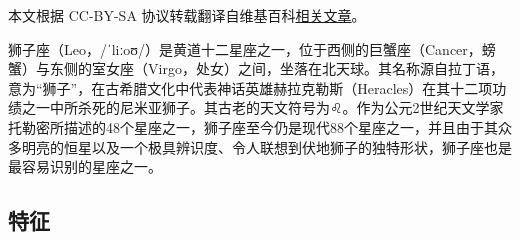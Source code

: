 
本文根据 CC-BY-SA 协议转载翻译自维基百科\href{https://en.wikipedia.org/wiki/Leo_(constellation)}{相关文章}。

狮子座（Leo，/ˈliːoʊ/）是黄道十二星座之一，位于西侧的巨蟹座（Cancer，螃蟹）与东侧的室女座（Virgo，处女）之间，坐落在北天球。其名称源自拉丁语，意为“狮子”，在古希腊文化中代表神话英雄赫拉克勒斯（Heracles）在其十二项功绩之一中所杀死的尼米亚狮子。其古老的天文符号为♌︎。作为公元2世纪天文学家托勒密所描述的48个星座之一，狮子座至今仍是现代88个星座之一，并且由于其众多明亮的恒星以及一个极具辨识度、令人联想到伏地狮子的独特形状，狮子座也是最容易识别的星座之一。
\subsection{特征}
